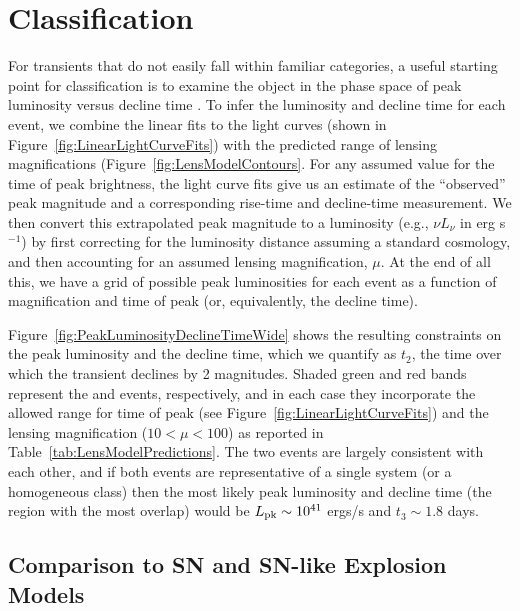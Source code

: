 \section{Classification}
\label{sec:Classification}

For transients that do not easily fall within familiar categories, a
useful starting point for classification is to examine the object in
the phase space of peak luminosity versus decline time \citep[see,
  e.g.,][]{Kasliwal:2010}.  To infer the luminosity and decline time
for each \spock event, we combine the linear fits to the light curves
(shown in Figure~\ref{fig:LinearLightCurveFits}) with the predicted
range of lensing magnifications
(Figure~\ref{fig:LensModelContours}. For any assumed value for the
time of peak brightness, the light curve fits give us an estimate of
the ``observed'' peak magnitude and a corresponding rise-time and
decline-time measurement.  We then convert this extrapolated peak
magnitude to a luminosity (e.g., $\nu L_\nu$ in erg s$^{-1}$) by
first correcting for the luminosity distance assuming a standard \LCDM
cosmology, and then accounting for an assumed lensing magnification,
$\mu$.  At the end of all this, we have a grid of possible peak
luminosities for each event as a function of magnification and time of
peak (or, equivalently, the decline time).

Figure~\ref{fig:PeakLuminosityDeclineTimeWide} shows the resulting
constraints on the peak luminosity and the decline time, which we
quantify as $t_2$, the time over which the transient declines by 2
magnitudes.  Shaded green and red bands represent the \spockone and
\spocktwo events, respectively, and in each case they incorporate the
allowed range for time of peak (see
Figure~\ref{fig:LinearLightCurveFits}) and the lensing magnification
($10<\mu<100$) as reported in Table~\ref{tab:LensModelPredictions}.
The two events are largely consistent with each other, and if both
events are representative of a single system (or a homogeneous class)
then the most likely peak luminosity and decline time (the region with
the most overlap) would be $L_{\rm pk}\sim10^{41}$ ergs/s and
$t_3\sim1.8$ days.

\subsection{Comparison to SN and SN-like Explosion Models}

